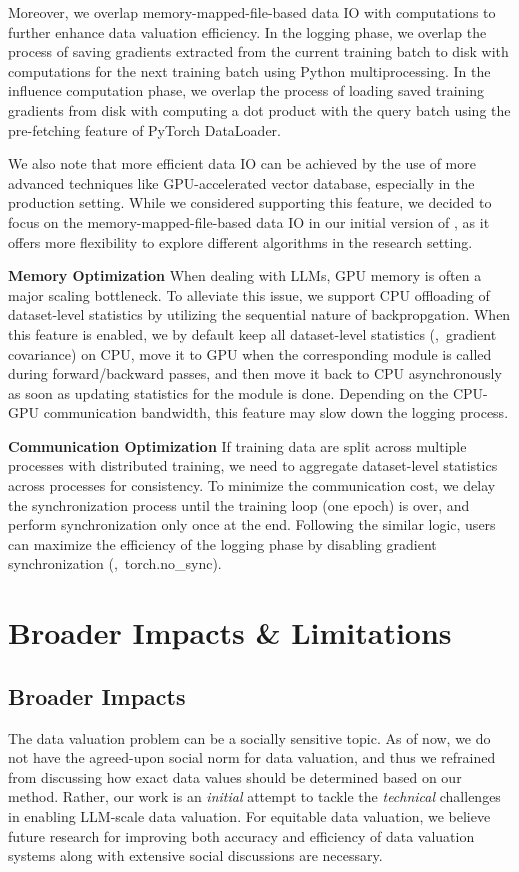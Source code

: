 Moreover, we overlap memory-mapped-file-based data IO with computations to further enhance data valuation efficiency. In the logging phase, we overlap the process of saving gradients extracted from the current training batch to disk with computations for the next training batch using Python multiprocessing. In the influence computation phase, we overlap the process of loading saved training gradients from disk with computing a dot product with the query batch using the pre-fetching feature of PyTorch DataLoader.

We also note that more efficient data IO can be achieved by the use of more advanced techniques like GPU-accelerated vector database, especially in the production setting. While we considered supporting this feature, we decided to focus on the memory-mapped-file-based data IO in our initial version of \software, as it offers more flexibility to explore different algorithms in the research setting.

\textbf{Memory Optimization\hspace{2.5mm}} When dealing with LLMs, GPU memory is often a major scaling bottleneck. To alleviate this issue, we support CPU offloading of dataset-level statistics by utilizing the sequential nature of backpropgation. When this feature is enabled, we by default keep all dataset-level statistics (\eg,\ gradient covariance) on CPU, move it to GPU when the corresponding module is called during forward/backward passes, and then move it back to CPU asynchronously as soon as updating statistics for the module is done. Depending on the CPU-GPU communication bandwidth, this feature may slow down the logging process.

\textbf{Communication Optimization\hspace{2.5mm}} If training data are split across multiple processes with distributed training, we need to aggregate dataset-level statistics across processes for consistency. To minimize the communication cost, we delay the synchronization process until the training loop (one epoch) is over, and perform synchronization only once at the end. Following the similar logic, users can maximize the efficiency of the logging phase by disabling gradient synchronization (\eg,\ torch.no\_sync).
\newpage

\section{Broader Impacts \& Limitations}
\label{sec:neurips}
\subsection{Broader Impacts}
\label{sec:impact}
The data valuation problem can be a socially sensitive topic. As of now, we do not have the agreed-upon social norm for data valuation, and thus we refrained from discussing how exact data values should be determined based on our method. Rather, our work is an \textit{initial} attempt to tackle the \textit{technical} challenges in enabling LLM-scale data valuation. For equitable data valuation, we believe future research for improving both accuracy and efficiency of data valuation systems along with extensive social discussions are necessary.

